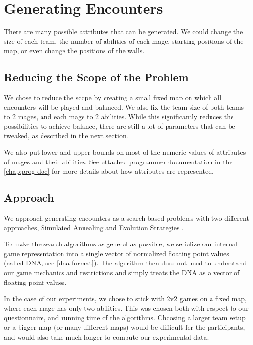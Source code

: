 \chapter{Generating Encounters}
\label{chapter04}

There are many possible attributes that can be generated. We could change the size of each team,
the number of abilities of each mage, starting positions of the map, or even change the positions of the walls.

\section{Reducing the Scope of the Problem}

We chose to reduce the scope by creating a small fixed map on which all encounters will be played and balanced.
We also fix the team size of both teams to 2 mages, and each mage to 2 abilities. While this significantly reduces
the possibilities to achieve balance, there are still a lot of parameters that can be tweaked, as described in the next section.

We also put lower and upper bounds on most of the numeric values of attributes of mages and their abilities. See attached programmer documentation in the \autoref{chap:prog-doc} for more details about how attributes are represented.

\section{Approach}

We approach generating encounters as a search based problems with two different
approaches, Simulated Annealing \citep{ai-modern} and Evolution Strategies
\citep{evolution-strategies}.

To make the search algorithms as general as possible, we serialize our internal game representation into a single vector of normalized floating point values (called DNA, see \autoref{dna-format}). The algorithm then does not need to understand our game mechanics and restrictions and simply treats the DNA as a vector of floating point values.

In the case of our experiments, we chose to stick with 2v2 games on a fixed map,
where each mage has only two abilities. This was chosen both with respect to our
questionnaire, and running time of the algorithms. Choosing a larger team setup or
a bigger map (or many different maps) would be difficult for the participants,
and would also take much longer to compute our experimental data.

